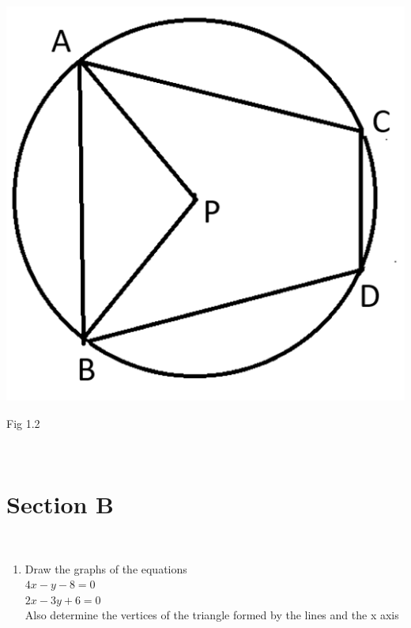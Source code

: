 \documentclass[journal,12pt,twocolumn]{IEEEtran}
\begin{document}
\begin{enumerate}[label=1.\arabic*]
\includegraphics[scale = 0.4]{fig 1.2}\\
\begin{flushright}
Fig 1.2\\
\end{flushright}
\vspace{1mm}\\
\section{Section B}
\vspace{3mm}\\
\begin{enumerate}[label=2.\arabic*]
\item Draw the graphs of the equations\\
\( 4x - y - 8 = 0\)\\
\( 2x - 3y + 6 = 0\)\\
Also determine the vertices of the triangle formed by the lines and the
x axis\\


\end{enumerate}
\end{enumerate}
\end{document}
